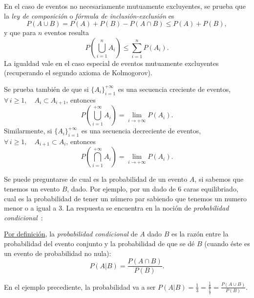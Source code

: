 En el caso de eventos no necesariamente mutuamente excluyentes, se prueba que la
{\it ley de composici\'on} o {\it f\'ormula de inclusi\'on-exclusi\'on} es
%
\[
P(A \cup B) = P(A) + P(B) - P(A \cap B) \leq P(A) + P(B), 
\]
%
y que para $n$ eventos resulta
%
\[
P\left( \bigcup_{i=1}^n A_i \right) \leq \sum_{i=1}^n P\left( A_i \right).
\]
%
La  igualdad  vale  en  el  caso  especial  de  eventos  mutuamente  excluyentes
(recuperando el segundo axioma de Kolmogorov).

Se  prueba tambi\'en  de que  si $\{  A_i \}_{i=1}^{+\infty}$  es  una secuencia
creciente  de eventos,  \ie $\forall  \, i  \ge 1,  \quad A_i  \subset A_{i+1}$,
entonces
%
\[
P\left( \bigcup_{i=1}^{+\infty} A_i \right) = \lim_{i \to +\infty} P(A_i).
\]
%
Similarmente,  si $\{ A_i  \}_{i=1}^{+\infty}$ es  una secuencia  decreciente de
eventos, \ie $\forall \, i \ge 1, \quad A_{i+1} \subset A_i$, entonces
%
\[
P\left( \bigcap_{i=1}^{+\infty} A_i \right) = \lim_{i \to +\infty} P(A_i).
\]

Se puede preguntarse de cual es la probabilidad de un evento $A$, si sabemos que
tenemos un evento $B$, dado.  Por  ejemplo, por un dado de 6 caras equilibriado,
cual es la probabilidad de tener  un n\'umero par sabiendo que tenemos un numero
menor  o a  igual  a  3.  La  respuesta  se encuentra  en  la  noci\'on de  {\it
  probabilidad   condicional}~\cite{Hau01,   Jef48,   Jef73,  Bre88,   ManWol95,
  JacPro03, ShaVov06}:
%
\begin{definicion}\label{Def:MP:ProbaCondicional}
  \underline{Por definici\'on},  la {\it  probabilidad condicional} de  $A$ dado
  $B$ es la raz\'on entre la  probabilidad del evento conjunto y la probabilidad
  de que se d\'e $B$ (cuando \'este es un evento de probabilidad no nula):
  \[
  P(A|B) = \frac{P(A \cap B)}{P(B)}.
  \]
\end{definicion}
%
En  el  ejemplo precediente,  la  probabilidad  va a  ser  $P(A|B)  = \frac13  =
\frac{\frac16}{\frac12}  = \frac{P(A  \cup B)}{P(B)}$. 

